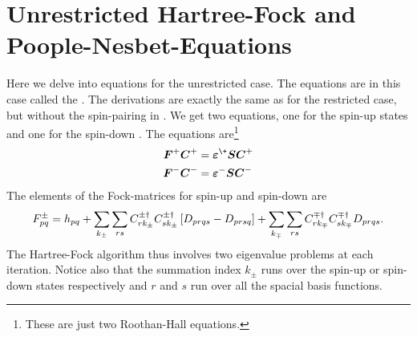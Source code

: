 \section{Unrestricted Hartree-Fock and Poople-Nesbet-Equations\label{sec:UHFPNE}}
    Here we delve into equations for the unrestricted case. The equations are
    in this case called the . The derivations
    are exactly the same as for the restricted case, but without the
    spin-pairing in . We get two equations, one for the
    spin-up states and one for the spin-down \cite{compphysThijssen}. The
    equations are\footnote{These are just two Roothan-Hall equations.}
        \begin{equation}
            \begin{aligned}
                \blds{F}^{+}\blds{C}^{+} &=
                \blds{\veps}^{\+}\blds{S}\blds{C}^{+} \\
                \blds{F}^{-}\blds{C}^{-} &=
                \blds{\veps}^{-}\blds{S}\blds{C}^{-}
            \end{aligned}
        \end{equation}
    The elements of the Fock-matrices for spin-up and spin-down are
        \begin{equation}
            F^{\pm}_{pq} = h_{pq} + \sum\limits_{k_{\pm}}\sum\limits_{rs}
            C^{\pm\dagger}_{rk_{\pm}} C^{\pm\dagger}_{sk_{\pm}} \left[D_{prqs}
            - D_{prsq}\right] + \sum\limits_{k_{\mp}}\sum\limits_{rs}
            C^{\mp\dagger}_{rk_{\mp}} C^{\mp\dagger}_{sk_{\mp}} D_{prqs}.
            \label{eq:UHFFockdef}
        \end{equation}
    The Hartree-Fock algorithm thus involves two eigenvalue problems at each
    iteration. Notice also that the summation index $k_{\pm}$ runs over the
    spin-up or spin-down states respectively and $r$ and $s$ run over all the
    spacial basis functions.

